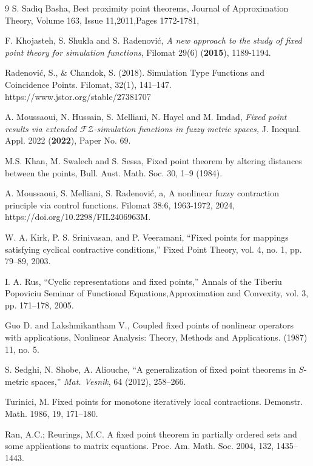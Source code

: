 \documentclass[sn-mathphys-num]{sn-jnl}%
\theoremstyle{thmstyleone}%
\theoremstyle{thmstyletwo}%
\theoremstyle{thmstylethree}%
\numberwithin{equation}{section}
\begin{document}
\begin{thebibliography}{9}
S. Sadiq Basha, Best proximity point theorems, Journal of Approximation Theory, Volume 163, Issue 11,2011,Pages 1772-1781,



F. Khojasteh, S. Shukla and S. Radenovi\'c, \emph{A new approach to the study of fixed point theory for simulation functions}, Filomat 29(6) (\textbf{2015}), 1189-1194.

Radenović, S., $\&$ Chandok, S. (2018). Simulation Type Functions and Coincidence Points. Filomat, 32(1), 141–147. https://www.jstor.org/stable/27381707

 A. Moussaoui, N. Hussain, S. Melliani, N. Hayel and M. Imdad, \emph{Fixed  point results via extended $\mathcal{FZ}$-simulation functions in fuzzy metric spaces,} J. Inequal. Appl. 2022 (\textbf{2022}), Paper No. 69.


M.S. Khan, M. Swalech and S. Sessa, Fixed point theorem by altering distances between the points, Bull. Aust. Math. Soc. 30,
1–9 (1984).

A. Moussaoui, S. Melliani, S. Radenovi\'c, a, A nonlinear fuzzy contraction principle via control functions. Filomat 38:6, 1963-1972, 2024, https://doi.org/10.2298/FIL2406963M.

W. A. Kirk, P. S. Srinivasan, and P. Veeramani, “Fixed points for mappings satisfying cyclical contractive conditions,” Fixed Point Theory, vol. 4, no. 1, pp. 79–89, 2003. 

I. A. Rus, “Cyclic representations and fixed points,” Annals of the Tiberiu Popoviciu Seminar of Functional Equations,Approximation and Convexity, vol. 3, pp. 171–178, 2005. 

 Guo D. and Lakshmikantham V., Coupled fixed points of nonlinear operators with applications, Nonlinear Analysis: Theory, Methods and Applications. (1987) 11, no. 5.

S. Sedghi, N. Shobe, A. Aliouche,
``A generalization of fixed point theorems in $S$-metric spaces,''
\textit{Mat. Vesnik}, 64 (2012), 258--266.

Turinici, M. Fixed points for monotone iteratively local contractions. Demonstr. Math. 1986, 19, 171–180.


Ran, A.C.; Reurings, M.C. A fixed point theorem in partially ordered sets and some applications to matrix equations. Proc. Am. Math. Soc. 2004, 132, 1435–1443. 


\end{thebibliography}
\end{document}
